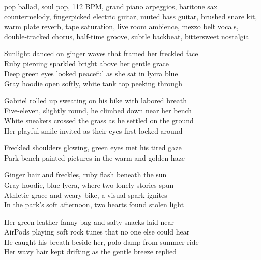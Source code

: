 

\begin{notes}
\end{notes}

\begin{style}
pop ballad, soul pop, 112 BPM, grand piano arpeggios, baritone sax countermelody, fingerpicked electric guitar, muted bass guitar, brushed snare kit, warm plate reverb, tape saturation, live room ambience, mezzo belt vocals, double-tracked chorus, half-time groove, subtle backbeat, bittersweet nostalgia
\end{style}

\begin{lyrics}

Sunlight danced on ginger waves that framed her freckled face\\
Ruby piercing sparkled bright above her gentle grace\\
Deep green eyes looked peaceful as she sat in lycra blue\\
Gray hoodie open softly, white tank top peeking through

Gabriel rolled up sweating on his bike with labored breath\\
Five-eleven, slightly round, he climbed down near her bench\\
White sneakers crossed the grass as he settled on the ground\\
Her playful smile invited as their eyes first locked around

Freckled shoulders glowing, green eyes met his tired gaze\\
Park bench painted pictures in the warm and golden haze

Ginger hair and freckles, ruby flash beneath the sun\\
Gray hoodie, blue lycra, where two lonely stories spun\\
Athletic grace and weary bike, a visual spark ignites\\
In the park’s soft afternoon, two hearts found stolen light

Her green leather fanny bag and salty snacks laid near\\
AirPods playing soft rock tunes that no one else could hear\\
He caught his breath beside her, polo damp from summer ride\\
Her wavy hair kept drifting as the gentle breeze replied


\end{lyrics}
